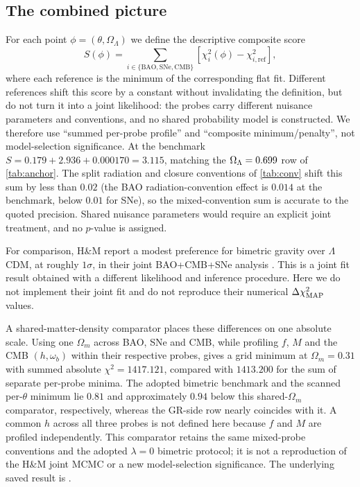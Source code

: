 \subsection{The combined picture}\label{sec:combined}
For each point $\phi=(\theta,\Omega_\Lambda)$ we define the descriptive composite score
\begin{equation}
S(\phi)=\sum_{i\in\{\mathrm{BAO,SNe,CMB}\}}\left[\chi_i^2(\phi)-\chi^2_{i,\mathrm{ref}}\right],
\end{equation}
where each reference is the minimum of the corresponding flat \LCDM{} fit. Different references shift this score by a constant without invalidating the definition, but do not turn it into a joint likelihood: the probes carry different nuisance parameters and conventions, and no shared probability model is constructed. We therefore use ``summed per-probe profile'' and ``composite minimum/penalty'', not model-selection significance. At the benchmark $S=0.179+2.936+0.000170=3.115$, matching the $\Omega_{\Lambda}=0.699$ row of \cref{tab:anchor}. The split radiation and closure conventions of \cref{tab:conv} shift this sum by less than $0.02$ (the BAO radiation-convention effect is $0.014$ at the benchmark, below $0.01$ for SNe), so the mixed-convention sum is accurate to the quoted precision. Shared nuisance parameters would require an explicit joint treatment, and no $p$-value is assigned.

For comparison, H\&M report a modest preference for bimetric gravity over $\Lambda$CDM, at roughly $1\sigma$, in their joint BAO+CMB+SNe analysis \citep{Hogas2025}. This is a joint fit result obtained with a different likelihood and inference procedure. Here we do not implement their joint fit and do not reproduce their numerical $\Delta\chi^2_{\rm MAP}$ values.

A shared-matter-density \LCDM{} comparator places these differences on one absolute scale. Using one $\Omega_m$ across BAO, SNe and CMB, while profiling $f$, $M$ and the CMB $(h,\omega_b)$ within their respective probes, gives a grid minimum at $\Omega_m=0.31$ with summed absolute $\chi^2=1417.121$, compared with $1413.200$ for the sum of separate per-probe \LCDM{} minima. The adopted bimetric benchmark and the scanned per-$\theta$ minimum lie $0.81$ and approximately $0.94$ below this shared-$\Omega_m$ comparator, respectively, whereas the GR-side row nearly coincides with it. A common $h$ across all three probes is not defined here because $f$ and $M$ are profiled independently. This comparator retains the same mixed-probe conventions and the adopted $\lambda=0$ bimetric protocol; it is not a reproduction of the H\&M joint MCMC or a new model-selection significance. The underlying saved result is .

